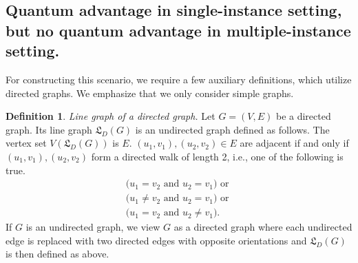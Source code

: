 \documentclass[journal, onecolumn, draftcls]{IEEEtran}
\theoremstyle{definition}
\newtheorem{remark}{Remark}
\newtheorem{definition}{Definition}
\newcommand{\calL}{\mathcal{L}}
\newcommand{\frL}{\mathfrak{L}}
\newcommand{\meng}[1]{\marginpar{+}{\bf Ruoyu's remark}: {\em #1}}
\newcommand{\aditya}[1]{\marginpar{+}{\bf Aditya's remark}: {\em #1}}
\begin{document}
\subsection{Quantum advantage in single-instance setting, but no quantum advantage in multiple-instance setting.\label{sec:line_graph_eg}}

For constructing this scenario, we require a few auxiliary definitions, which utilize directed graphs. We emphasize that we only consider simple graphs.%
\begin{definition}{\it Line graph of a directed graph.} \label{defn:directed_line_graph}
    Let $G = (V,E)$ be a directed graph. Its line graph $\mathfrak{L}_D(G)$ is an undirected graph defined as follows.  The vertex set $V(\mathfrak{L}_D(G))$ is $E$. $(u_1,v_1),(u_2,v_2)\in E$ are adjacent if and only if $(u_1,v_1),(u_2,v_2)$ form a directed walk of length 2, i.e., one of the following is true.
    \begin{align*}
    \big ( u_1 = v_2\text{ and }u_2 = v_1 \big )\text{ or }\\
    \big ( u_1 \ne v_2\text{ and }u_2 = v_1 \big )\text{ or }\\
    \big ( u_1 = v_2\text{ and }u_2 \ne v_1 \big ).
    \end{align*}
    If $G$ is an undirected graph, we view $G$ as a directed graph where each undirected edge is replaced with two directed edges with opposite orientations and $\frL_D(G)$ is then defined as above.
\end{definition}
\end{document}
